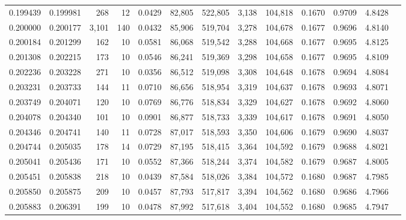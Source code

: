 \begin{tabular}{rrrrrrrrrrrrr}
0.199439 & 0.199981 &   268 &  12 &                                     0.0429 &  82,805 & 522,805 &   3,138 & 104,818 & 0.1670 & 0.9709 & 4.8428 \\
0.200000 & 0.200177 & 3,101 & 140 &                                     0.0432 &  85,906 & 519,704 &   3,278 & 104,678 & 0.1677 & 0.9696 & 4.8140 \\
0.200184 & 0.201299 &   162 &  10 &                                     0.0581 &  86,068 & 519,542 &   3,288 & 104,668 & 0.1677 & 0.9695 & 4.8125 \\
0.201308 & 0.202215 &   173 &  10 &                                     0.0546 &  86,241 & 519,369 &   3,298 & 104,658 & 0.1677 & 0.9695 & 4.8109 \\
0.202236 & 0.203228 &   271 &  10 &                                     0.0356 &  86,512 & 519,098 &   3,308 & 104,648 & 0.1678 & 0.9694 & 4.8084 \\
0.203231 & 0.203733 &   144 &  11 &                                     0.0710 &  86,656 & 518,954 &   3,319 & 104,637 & 0.1678 & 0.9693 & 4.8071 \\
0.203749 & 0.204071 &   120 &  10 &                                     0.0769 &  86,776 & 518,834 &   3,329 & 104,627 & 0.1678 & 0.9692 & 4.8060 \\
0.204078 & 0.204340 &   101 &  10 &                                     0.0901 &  86,877 & 518,733 &   3,339 & 104,617 & 0.1678 & 0.9691 & 4.8050 \\
0.204346 & 0.204741 &   140 &  11 &                                     0.0728 &  87,017 & 518,593 &   3,350 & 104,606 & 0.1679 & 0.9690 & 4.8037 \\
0.204744 & 0.205035 &   178 &  14 &                                     0.0729 &  87,195 & 518,415 &   3,364 & 104,592 & 0.1679 & 0.9688 & 4.8021 \\
0.205041 & 0.205436 &   171 &  10 &                                     0.0552 &  87,366 & 518,244 &   3,374 & 104,582 & 0.1679 & 0.9687 & 4.8005 \\
0.205451 & 0.205838 &   218 &  10 &                                     0.0439 &  87,584 & 518,026 &   3,384 & 104,572 & 0.1680 & 0.9687 & 4.7985 \\
0.205850 & 0.205875 &   209 &  10 &                                     0.0457 &  87,793 & 517,817 &   3,394 & 104,562 & 0.1680 & 0.9686 & 4.7966 \\
0.205883 & 0.206391 &   199 &  10 &                                     0.0478 &  87,992 & 517,618 &   3,404 & 104,552 & 0.1680 & 0.9685 & 4.7947 \\

\end{tabular}
